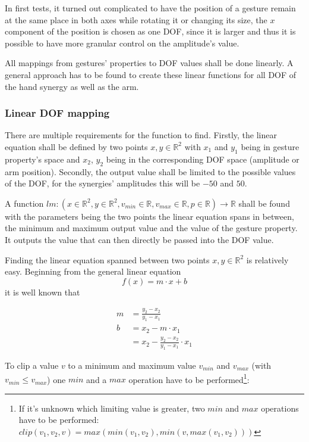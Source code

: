In first tests, it turned out complicated to have the position of a gesture remain at the same place in both axes while rotating it or changing its size, the $x$ component of the position is chosen as one DOF, since it is larger and thus it is possible to have more granular control on the amplitude's value.

All mappings from gestures' properties to DOF values shall be done linearly. A general approach has to be found to create these linear functions for all DOF of the hand synergy as well as the arm.

\subsubsection{Linear DOF mapping}

There are multiple requirements for the function to find. Firstly, the linear equation shall be defined by two points $x, y \in \mathbb{R}^2$ with $x_1$ and $y_1$ being in gesture property's space and $x_2$, $y_2$ being in the corresponding DOF space (amplitude or arm position). Secondly, the output value shall be limited to the possible values of the DOF, for the synergies' amplitudes this will be $-50$ and $50$.

A function $lm:(x \in \mathbb{R}^2, y \in \mathbb{R}^2, v_{min} \in \mathbb{R}, v_{max} \in \mathbb{R}, p \in \mathbb{R}) \rightarrow \mathbb{R}$ shall be found with the parameters being the two points the linear equation spans in between, the minimum and maximum output value and the value of the gesture property. It outputs the value that can then directly be passed into the DOF value.

Finding the linear equation spanned between two points $x, y \in \mathbb{R}^2$ is relatively easy. Beginning from the general linear equation
\begin{equation*}
f(x) = m \cdot x + b
\end{equation*}
it is well known that

\begin{align*}
m &= \frac{y_2 - x_2}{y_1 - x_1} \\
b &= x_2 - m \cdot x_1  \\
&= x_2 - \frac{y_2 - x_2}{y_1 - x_1} \cdot x_1
\end{align*}

To clip a value $v$ to a minimum and maximum value $v_{min}$ and $v_{max}$ (with $v_{min} \leq v_{max}$) one $min$ and a $max$ operation have to be performed\footnote{If it's unknown which limiting value is greater, two $min$ and $max$ operations have to be performed: $clip(v_1, v_2, v) = max(min(v_1, v_2), min(v, max(v_1, v_2)))$}:

